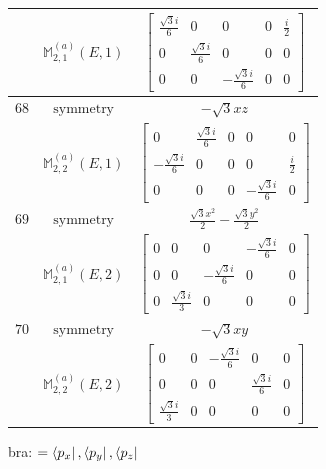 \documentclass[fleqn,8pt,landscape]{jsarticle}
\begin{document}
\begin{longtable}{ccc}
$  $ & $ \mathbb{M}_{2,1}^{(a)}(E,1) $ & $ \begin{bmatrix} \frac{\sqrt{3} i}{6} & 0 & 0 & 0 & \frac{i}{2} \\ 0 & \frac{\sqrt{3} i}{6} & 0 & 0 & 0 \\ 0 & 0 & - \frac{\sqrt{3} i}{6} & 0 & 0 \end{bmatrix} $ \\ \hline
$ 68 $ & $ \text{symmetry} $ & $ - \sqrt{3} x z $ \\
$  $ & $ \mathbb{M}_{2,2}^{(a)}(E,1) $ & $ \begin{bmatrix} 0 & \frac{\sqrt{3} i}{6} & 0 & 0 & 0 \\ - \frac{\sqrt{3} i}{6} & 0 & 0 & 0 & \frac{i}{2} \\ 0 & 0 & 0 & - \frac{\sqrt{3} i}{6} & 0 \end{bmatrix} $ \\ \hline
$ 69 $ & $ \text{symmetry} $ & $ \frac{\sqrt{3} x^{2}}{2} - \frac{\sqrt{3} y^{2}}{2} $ \\
$  $ & $ \mathbb{M}_{2,1}^{(a)}(E,2) $ & $ \begin{bmatrix} 0 & 0 & 0 & - \frac{\sqrt{3} i}{6} & 0 \\ 0 & 0 & - \frac{\sqrt{3} i}{6} & 0 & 0 \\ 0 & \frac{\sqrt{3} i}{3} & 0 & 0 & 0 \end{bmatrix} $ \\ \hline
$ 70 $ & $ \text{symmetry} $ & $ - \sqrt{3} x y $ \\
$  $ & $ \mathbb{M}_{2,2}^{(a)}(E,2) $ & $ \begin{bmatrix} 0 & 0 & - \frac{\sqrt{3} i}{6} & 0 & 0 \\ 0 & 0 & 0 & \frac{\sqrt{3} i}{6} & 0 \\ \frac{\sqrt{3} i}{3} & 0 & 0 & 0 & 0 \end{bmatrix} $ \\ \hline
\end{longtable}
bra: $=\bra{p_{x}}, \bra{p_{y}}, \bra{p_{z}}$
\end{document}
